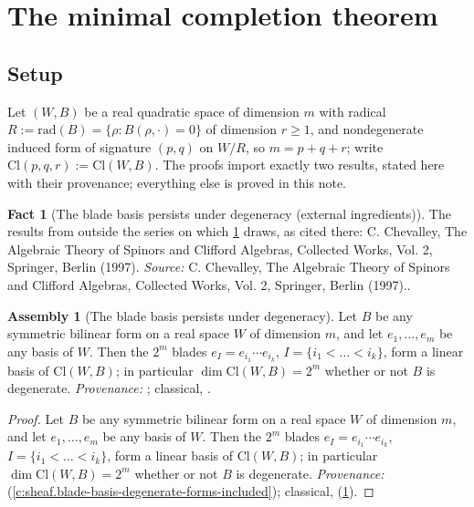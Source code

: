 \documentclass[11pt]{article}
\theoremstyle{definition}
\newtheorem{fact}[theorem]{Fact}
\newtheorem{assembled}[theorem]{Assembly}
\theoremstyle{plain}
\providecommand{\Cl}{}\renewcommand{\Cl}{\mathrm{Cl}}
\providecommand{\rad}{}\renewcommand{\rad}{\mathrm{rad}}
\begin{document}
\section{The minimal completion theorem}

\subsection*{Setup}
\label{c:note.conformal.setting-setup}
Let $(W, B)$ be a real quadratic space of dimension $m$ with radical $R := \rad(B) = \{\rho : B(\rho, \cdot) = 0\}$ of dimension $r \geq 1$, and nondegenerate induced form of signature $(p,q)$ on $W/R$, so $m = p + q + r$; write $\Cl(p,q,r) := \Cl(W,B)$. The proofs import exactly two results, stated here with their provenance; everything else is proved in this note.

\begin{fact}[The blade basis persists under degeneracy (external ingredients)]\label{c:conformal.blade-basis-persists-under-degeneracy-external}
The results from outside the series on which \ref{c:conformal.blade-basis-persists-under-degeneracy} draws, as cited there: C. Chevalley, The Algebraic Theory of Spinors and Clifford Algebras, Collected Works, Vol. 2, Springer, Berlin (1997).
\emph{Source:} C. Chevalley, The Algebraic Theory of Spinors and Clifford Algebras, Collected Works, Vol. 2, Springer, Berlin (1997)..
\end{fact}

\begin{assembled}[The blade basis persists under degeneracy]\label{c:conformal.blade-basis-persists-under-degeneracy}
Let $B$ be any symmetric bilinear form on a real space $W$ of dimension $m$, and let $e_1, \dots, e_m$ be any basis of $W$. Then the $2^m$ blades $e_I = e_{i_1} \cdots e_{i_k}$, $I = \{i_1 < \dots < i_k\}$, form a linear basis of $\Cl(W, B)$; in particular $\dim \Cl(W,B) = 2^m$ whether or not $B$ is degenerate. \emph{Provenance:} \cite[Lem.~2.6]{ButlerT4}; classical, \cite{Chevalley1997}.
\end{assembled}
\begin{proof}
Let $B$ be any symmetric bilinear form on a real space $W$ of dimension $m$, and let $e_1, \dots, e_m$ be any basis of $W$. Then the $2^m$ blades $e_I = e_{i_1} \cdots e_{i_k}$, $I = \{i_1 < \dots < i_k\}$, form a linear basis of $\Cl(W, B)$; in particular $\dim \Cl(W,B) = 2^m$ whether or not $B$ is degenerate. \emph{Provenance:} \cite[Lem.~2.6]{ButlerT4} (\ref{c:sheaf.blade-basis-degenerate-forms-included}); classical, \cite{Chevalley1997} (\ref{c:conformal.blade-basis-persists-under-degeneracy-external}).

\end{proof}
\end{document}
